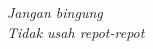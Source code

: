 \clearpage

\begin{center}
    \vspace*{\fill}
    \textit{
    Jangan bingung\\
    Tidak usah repot-repot
    }
    \vspace*{\fill}
\end{center}

\clearpage